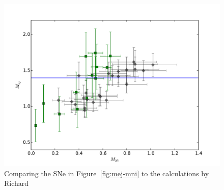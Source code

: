 \documentclass{article}
\begin{document}
\begin{figure}
\includegraphics[width=.5\textwidth, trim = 0 0 30 30]{mej_mni_richard_comparison.pdf}
\caption{Comparing the SNe in Figure~\ref{fig:mej-mni} to the calculations by Richard}
\end{figure}

\end{document}
